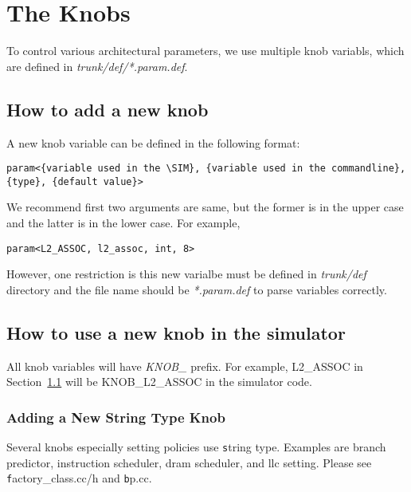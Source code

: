 

\chapter{The Knobs}
\label{sec:knob}

To control various architectural parameters, we use multiple knob
variabls, which are defined in \textit{trunk/def/*.param.def}.

\section{How to add a new knob}
\label{sec:knob1}

A new knob variable can be defined in the following format:

\begin{Verbatim}
param<{variable used in the \SIM}, {variable used in the commandline}, {type}, {default value}>
\end{Verbatim}

We recommend first two arguments are same, but the former is in the
upper case and the latter is in the lower case. For example,

\begin{Verbatim}
param<L2_ASSOC, l2_assoc, int, 8>
\end{Verbatim}


However, one restriction is this new varialbe must be defined
in \textit{trunk/def} directory and the file name should
be \textit{*.param.def} to parse variables correctly.


\section{How to use a new knob in the simulator}

All knob variables will have \textit{KNOB\_} prefix. For example,
L2\_ASSOC in Section~\ref{sec:knob1} will be KNOB\_L2\_ASSOC in the
simulator code.

\subsection{Adding a New String Type Knob}
Several knobs especially setting policies use {\texttt string} type. 
Examples are branch predictor, instruction scheduler, dram scheduler, and llc setting. Please see {\texttt factory\_class.cc/h} and {\texttt bp.cc}. 





